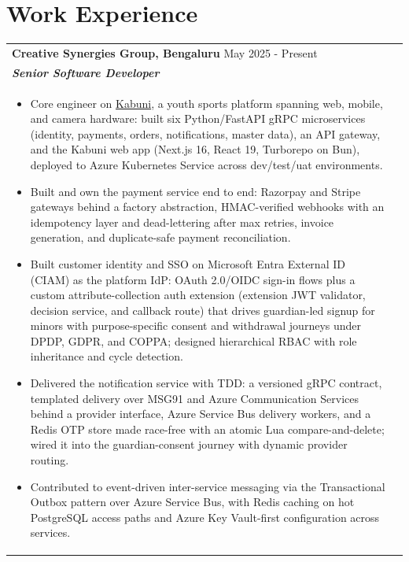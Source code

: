 \documentclass[a4paper,8pt]{article}
\begin{document}
\section{Work Experience}
\begin{tabularx}{\linewidth}{ @{}l r@{} }
\textbf{{Creative Synergies Group, Bengaluru}} \hfill \color[HTML]{371e77} May 2025 - Present \\[4pt]
\color[HTML]{371e77}\textbf{\textit{Senior Software Developer}}\ \hfill \color[HTML]{4B28A4} \\[5pt]
\begin{minipage}[t]{\linewidth}
    \begin{itemize}[nosep,after=\strut, leftmargin=2em, itemsep=2pt]
        \item Core engineer on \href{https://www.kabuni.com/}{Kabuni}, a youth sports platform spanning web, mobile, and camera hardware: built six Python/FastAPI gRPC microservices (identity, payments, orders, notifications, master data), an API gateway, and the Kabuni web app (Next.js 16, React 19, Turborepo on Bun), deployed to Azure Kubernetes Service across dev/test/uat environments.
        \item Built and own the payment service end to end: Razorpay and Stripe gateways behind a factory abstraction, HMAC-verified webhooks with an idempotency layer and dead-lettering after max retries, invoice generation, and duplicate-safe payment reconciliation.
        \item Built customer identity and SSO on Microsoft Entra External ID (CIAM) as the platform IdP: OAuth 2.0/OIDC sign-in flows plus a custom attribute-collection auth extension (extension JWT validator, decision service, and callback route) that drives guardian-led signup for minors with purpose-specific consent and withdrawal journeys under DPDP, GDPR, and COPPA; designed hierarchical RBAC with role inheritance and cycle detection.
        \item Delivered the notification service with TDD: a versioned gRPC contract, templated delivery over MSG91 and Azure Communication Services behind a provider interface, Azure Service Bus delivery workers, and a Redis OTP store made race-free with an atomic Lua compare-and-delete; wired it into the guardian-consent journey with dynamic provider routing.
        \item Contributed to event-driven inter-service messaging via the Transactional Outbox pattern over Azure Service Bus, with Redis caching on hot PostgreSQL access paths and Azure Key Vault-first configuration across services.

\end{itemize}
\end{minipage}
\end{tabularx}
\end{document}

